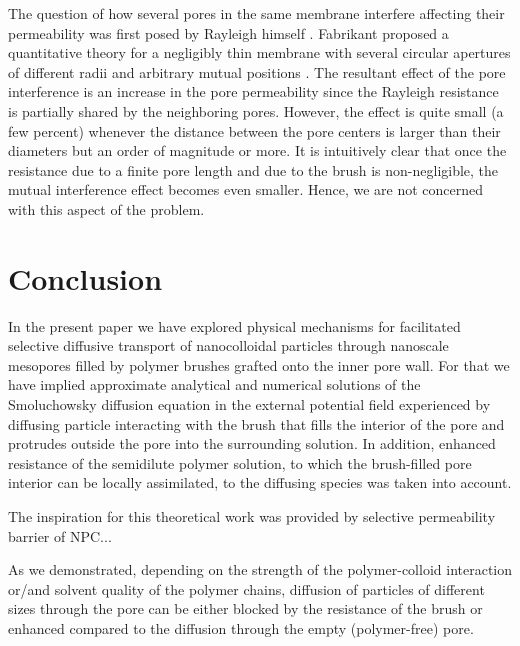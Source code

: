 \documentclass[12pt, a4paper]{article}
\begin{document}
The question of how several pores in the same membrane interfere affecting their permeability was first posed by Rayleigh himself \cite{Strutt1878}. 
Fabrikant  proposed a quantitative theory for a negligibly thin membrane with several circular apertures of different radii and arbitrary mutual positions \cite{Fabrikant1985}. 
The resultant effect of the pore interference is an increase in the pore permeability since the Rayleigh resistance is partially shared by the neighboring pores. 
However, the effect is quite small (a few percent) whenever the distance between the pore centers is larger than their diameters but an order of magnitude or more. 
It is intuitively clear that once the resistance due to a finite pore length and due to the brush is non-negligible, the mutual interference effect 
becomes even smaller. Hence, we are not concerned with this aspect of the problem.


\section{Conclusion}

In the present paper we have explored physical mechanisms for facilitated selective diffusive transport of nanocolloidal particles through nanoscale mesopores
filled by polymer brushes grafted onto the inner pore wall. 
For that we have implied approximate analytical and numerical solutions of the 
Smoluchowsky diffusion equation in the external potential field experienced by diffusing particle interacting with the brush that fills the interior of the pore
and protrudes outside the pore into the surrounding solution. In addition, enhanced resistance of the semidilute polymer solution, to which the brush-filled pore
interior can be locally assimilated, to the diffusing species was taken into account. 

The inspiration for this theoretical work was provided by selective permeability barrier of NPC... 

As we demonstrated, depending on the strength of the polymer-colloid interaction or/and solvent quality of the polymer chains, diffusion of particles of different sizes
through the pore can be either blocked by the resistance of the brush or enhanced compared to the diffusion through the empty (polymer-free) pore. 
\end{document}
